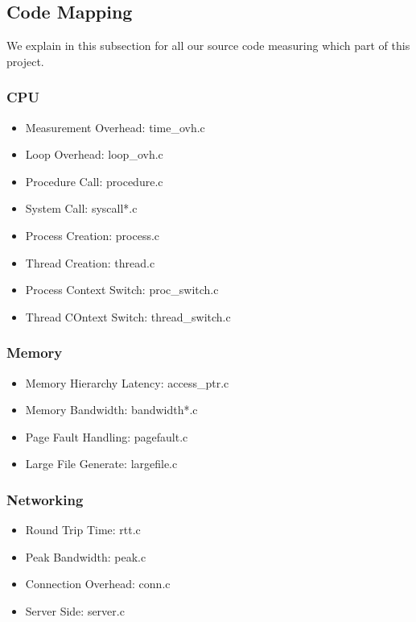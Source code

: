 \subsection{Code Mapping}

We explain in this subsection for all our source code measuring which part of this project.

\subsubsection{CPU}
\begin{itemize}
    \item Measurement Overhead: time\_ovh.c
    \item Loop Overhead: loop\_ovh.c
    \item Procedure Call: procedure.c
    \item System Call: syscall*.c
    \item Process Creation: process.c
    \item Thread Creation: thread.c
    \item Process Context Switch: proc\_switch.c
    \item Thread COntext Switch: thread\_switch.c
\end{itemize}

\subsubsection{Memory}
\begin{itemize}
    \item Memory Hierarchy Latency: access\_ptr.c
    \item Memory Bandwidth: bandwidth*.c
    \item Page Fault Handling: pagefault.c
    \item Large File Generate: largefile.c
\end{itemize}

\subsubsection{Networking}
\begin{itemize}
    \item Round Trip Time: rtt.c
    \item Peak Bandwidth: peak.c
    \item Connection Overhead: conn.c
    \item Server Side: server.c
\end{itemize}

